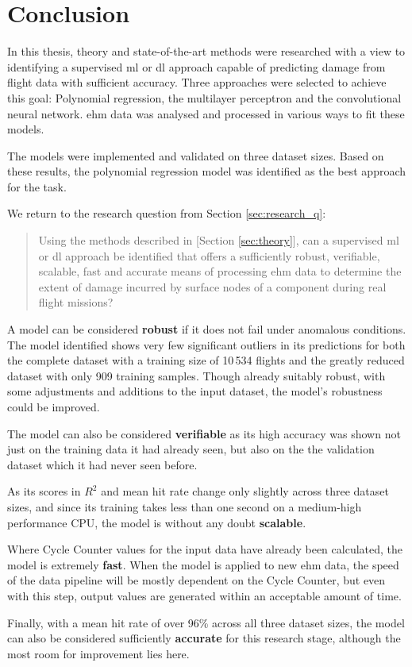 \chapter{Conclusion} \label{sec:conclusion}
In this thesis, theory and state-of-the-art methods were researched with a view to identifying a supervised \ac{ml} or \ac{dl} approach capable of predicting damage from flight data with sufficient accuracy. Three approaches were selected to achieve this goal: Polynomial regression, the multilayer perceptron and the convolutional neural network. \ac{ehm} data was analysed and processed in various ways to fit these models.

The models were implemented and validated on three dataset sizes. Based on these results, the polynomial regression model was identified as the best approach for the task.

We return to the research question from Section \ref{sec:research_q}:

\begin{quote}
    Using the methods described in [Section \ref{sec:theory}], can a supervised \ac{ml} or \ac{dl} approach be identified that offers a sufficiently robust, verifiable, scalable, fast and accurate means of processing \ac{ehm} data to determine the extent of damage incurred by surface nodes of a component during real flight missions?
\end{quote}

A model can be considered \textbf{robust} if it does not fail under anomalous conditions. The model identified shows very few significant outliers in its predictions for both the complete dataset with a training size of 10\,534 flights and the greatly reduced dataset with only 909 training samples. Though already suitably robust, with some adjustments and additions to the input dataset, the model's robustness could be improved.

The model can also be considered \textbf{verifiable} as its high accuracy was shown not just on the training data it had already seen, but also on the the validation dataset which it had never seen before.

As its scores in \(R^2\) and mean hit rate change only slightly across three dataset sizes, and since its training takes less than one second on a medium-high performance CPU, the model is without any doubt \textbf{scalable}.

Where Cycle Counter values for the input data have already been calculated, the model is extremely \textbf{fast}. When the model is applied to new \ac{ehm} data, the speed of the data pipeline will be mostly dependent on the Cycle Counter, but even with this step, output values are generated within an acceptable amount of time.

Finally, with a mean hit rate of over 96\% across all three dataset sizes, the model can also be considered sufficiently \textbf{accurate} for this research stage, although the most room for improvement lies here.
